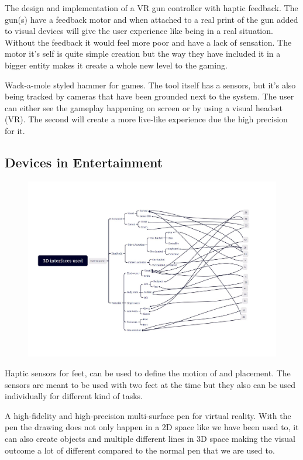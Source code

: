 The design and implementation of a VR gun controller with haptic feedback. The gun(s) have a feedback motor and when attached to a real print of the gun added to visual devices will give the user experience like being in a real situation. Without the feedback it would feel more poor and have a lack of sensation. The motor it's self is quite simple creation but the way they have included it in a bigger entity makes it create a whole new level to the gaming.

Wack-a-mole styled hammer for games. The tool itself has a sensors, but it's also being tracked by cameras that have been grounded next to the system. The user can either see the gameplay happening on screen or by using a visual headset (VR). The second will create a more live-like experience due the high precision for it.

\subsection{Devices in Entertainment}
\label{entertainment}

\begin{figure}[htbp]
	\includegraphics[width=\columnwidth]{figures/entertainment.pdf}
	\label{fig:entertainment}
\end{figure}


Haptic sensors for feet, can be used to define the motion of and placement. The sensors are meant to be used with two feet at the time but they also can be used individually for different kind of tasks. 

A high-fidelity and high-precision multi-surface pen for virtual reality. With the pen the drawing does not only happen in a 2D space like we have been used to, it can also create objects and multiple different lines in 3D space making the visual outcome a lot of different compared to the normal pen that we are used to.

